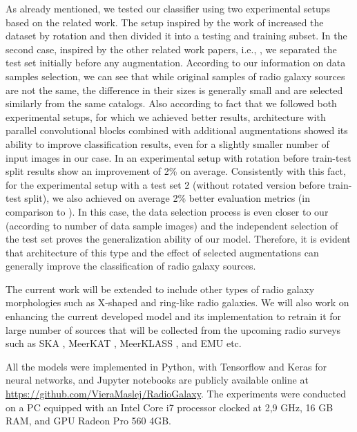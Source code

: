 \documentclass[fleqn,usenatbib]{mnras}
\begin{document}
As already mentioned, we tested our classifier using two experimental setups based on the related work. The setup inspired by the work of  \cite{2} increased the dataset by rotation and then divided it into a testing and training subset. In the second case, inspired by the other related work papers, i.e., \cite{3, Lukic_2018, 1}, we separated the test set initially before any augmentation. According to our information on data samples selection, we can see that while original samples of radio galaxy sources are not the same, the difference in their sizes is generally small and are selected similarly from the same catalogs. Also according to fact that we followed both experimental setups, for which we achieved better results, architecture with parallel convolutional blocks combined with additional augmentations showed its ability to improve classification results, even for a slightly smaller number of input images in our case. In an experimental setup with rotation before train-test split results show an improvement of 2\% on average. Consistently with this fact, for the experimental setup with a test set 2 (without rotated version before train-test split), we also achieved on average 2\% better evaluation metrics (in comparison to \cite{Lukic_2018}). In this case, the data selection process is even closer to our (according to number of data sample images) and the independent selection of the test set proves the generalization ability of our model. Therefore, it is evident  that architecture of this type and the effect of selected augmentations can generally improve the classification of radio galaxy sources.

The current work will be extended to include other types of radio galaxy morphologies such as X-shaped and ring-like radio galaxies. We will also work on enhancing the current developed model and its implementation to retrain it for large number of sources that will be collected from the upcoming radio surveys such as SKA \citep{dewdney2009square}, MeerKAT \citep{Jonas2016}, MeerKLASS \citep{Santos2017}, and EMU \citep{Hopkins2015} etc.

All the models were implemented in Python, with Tensorflow \citep{abadi2016tensorflow} and Keras \citep{keras} for neural networks, and Jupyter notebooks are publicly available online at \url{https://github.com/VieraMaslej/RadioGalaxy}. The experiments were conducted on a PC equipped with an Intel Core i7 processor clocked at 2,9 GHz, 16 GB RAM, and GPU Radeon Pro 560 4GB.
\end{document}
